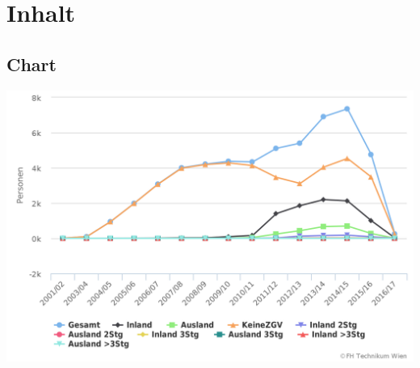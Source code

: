 \documentclass [a4paper,abstracton,titlepage]{scrartcl}
\begin{document}
\section{Inhalt}
\label{_inhalt}
\hypertarget{_chart}{}
\subsection{Chart}
\label{_chart}
 \par\noindent{}\includegraphics[]{images/chart6.png}
\hypertarget{_daten}{}
\end{document}
